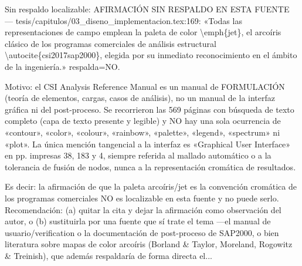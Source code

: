 \documentclass[11pt,a4paper]{article}
\newcommand{\campo}[1]{\textcolor{gris}{\footnotesize #1}}
\begin{document}
{\small\campo{Sin respaldo localizable:} AFIRMACIÓN SIN RESPALDO EN ESTA FUENTE --- tesis/capitulos/03\_diseno\_implementacion.tex:169: «Todas las representaciones de campo emplean la paleta de color \textbackslash{}emph\{jet\}, el arcoíris clásico de los programas comerciales de análisis estructural \textbackslash{}autocite\{csi2017sap2000\}, elegida por su inmediato reconocimiento en el ámbito de la ingeniería.» respalda=NO.

Motivo: el CSI Analysis Reference Manual es un manual de FORMULACIÓN (teoría de elementos, cargas, casos de análisis), no un manual de la interfaz gráfica ni del post-proceso. Se recorrieron las 569 páginas con búsqueda de texto completo (capa de texto presente y legible) y NO hay una sola ocurrencia de «contour», «color», «colour», «rainbow», «palette», «legend», «spectrum» ni «plot». La única mención tangencial a la interfaz es «Graphical User Interface» en pp. impresas 38, 183 y 4, siempre referida al mallado automático o a la tolerancia de fusión de nodos, nunca a la representación cromática de resultados.

Es decir: la afirmación de que la paleta arcoíris/jet es la convención cromática de los programas comerciales NO es localizable en esta fuente y no puede serlo. Recomendación: (a) quitar la cita y dejar la afirmación como observación del autor, o (b) sustituirla por una fuente que sí trate el tema ---el manual de usuario/verification o la documentación de post-proceso de SAP2000, o bien literatura sobre mapas de color arcoíris (Borland \& Taylor, Moreland, Rogowitz \& Treinish), que además respaldaría de forma directa el...\par}
\end{document}
